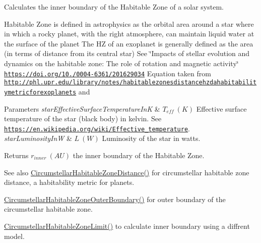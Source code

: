 Calculates the inner boundary of the Habitable Zone of a solar system. 

Habitable Zone is defined in astrophysics as the orbital area around a star where in which a rocky planet, with the right atmosphere, can maintain liquid water at the surface of the planet The HZ of an exoplanet is generally defined as the area (in terms of distance from its central star) See \char`\"{}\+Impacts of stellar evolution and dynamics on the habitable zone\+: The role of rotation and magnetic activity\char`\"{} \href{https://doi.org/10.1051/0004-6361/201629034}{\tt https\+://doi.\+org/10./0004-\/6361/201629034} Equation taken from \href{http://phl.upr.edu/library/notes/habitablezonesdistancehzdahabitabilitymetricforexoplanets}{\tt http\+://phl.\+upr.\+edu/library/notes/habitablezonesdistancehzdahabitabilitymetricforexoplanets} and 
\begin{DoxyParams}{Parameters}
{\em star\+Effective\+Surface\+Temperature\+InK} & $T_{eff}\ (K)$ Effective surface temperature of the star (black body) in kelvin. See \href{https://en.wikipedia.org/wiki/Effective_temperature}{\tt https\+://en.\+wikipedia.\+org/wiki/\+Effective\+\_\+temperature}. \\
\hline
{\em star\+Luminosity\+InW} & $L\ (W)$ Luminosity of the star in watts. \\
\hline
\end{DoxyParams}
\begin{DoxyReturn}{Returns}
$r_{inner}\ (AU)$ the inner boundary of the Habitable Zone. 
\end{DoxyReturn}
\begin{DoxySeeAlso}{See also}
\mbox{\hyperlink{group___e_g_x_phys-_circumstellar_habitable_zone_limit_ga3247e5fe14db39121ce622207af172fd}{Circumstellar\+Habitable\+Zone\+Distance()}} for circumstellar habitable zone distance, a habitability metric for planets. 

\mbox{\hyperlink{group___e_g_x_phys-_circumstellar_habitable_zone_limit_ga3a6dbbdaddddd071cb1f0a20e40d83bd}{Circumstellar\+Habitable\+Zone\+Outer\+Boundary()}} for outer boundary of the circumstellar habitable zone. 

\mbox{\hyperlink{group___e_g_x_phys-_circumstellar_habitable_zone_limit_ga809f4c557ce6d2fe566a69c2a8a5d41b}{Circumstellar\+Habitable\+Zone\+Limit()}} to calculate inner boundary using a diffrent model. 
\end{DoxySeeAlso}
\mbox{\label{group___e_g_x_phys-_circumstellar_habitable_zone_limit_ga809f4c557ce6d2fe566a69c2a8a5d41b}} 
